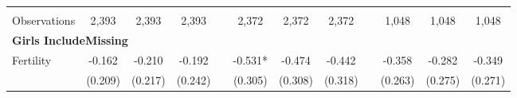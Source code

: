 \begin{landscape}
\begin{table}[htpb!]
\begin{center}
\begin{tabular}{lcccp{2mm}cccp{2mm}ccc}
\begin{footnotesize}\end{footnotesize}&\begin{footnotesize}\end{footnotesize}&\begin{footnotesize}\end{footnotesize}&\begin{footnotesize}\end{footnotesize}&\begin{footnotesize}\end{footnotesize}&\begin{footnotesize}\end{footnotesize}&\begin{footnotesize}\end{footnotesize}&\begin{footnotesize}\end{footnotesize}&\begin{footnotesize}\end{footnotesize}&\begin{footnotesize}\end{footnotesize}&\begin{footnotesize}\end{footnotesize}&\begin{footnotesize}\end{footnotesize}\\Observations&2,393&2,393&2,393&&2,372&2,372&2,372&&1,048&1,048&1,048\\
\multicolumn{12}{l}{\textbf{Girls IncludeMissing}}\\ 
Fertility&-0.162&-0.210&-0.192&&-0.531*&-0.474&-0.442&&-0.358&-0.282&-0.349\\
&(0.209)&(0.217)&(0.242)&&(0.305)&(0.308)&(0.318)&&(0.263)&(0.275)&(0.271)\\

\end{tabular}
\end{center}
\end{table}
\end{landscape}
